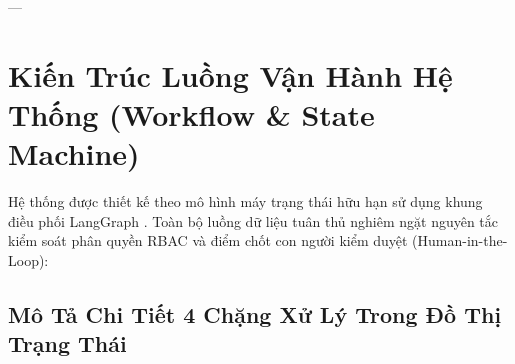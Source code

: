 \documentclass[11pt,a4paper]{article}
\begin{document}
---

\section{Kiến Trúc Luồng Vận Hành Hệ Thống (Workflow \& State Machine)}

Hệ thống được thiết kế theo mô hình máy trạng thái hữu hạn sử dụng khung điều phối LangGraph \cite{langgraph2024}. Toàn bộ luồng dữ liệu tuân thủ nghiêm ngặt nguyên tắc kiểm soát phân quyền RBAC \cite{rbac1996} và điểm chốt con người kiểm duyệt (Human-in-the-Loop):

\subsection{Mô Tả Chi Tiết 4 Chặng Xử Lý Trong Đồ Thị Trạng Thái}
\end{document}
